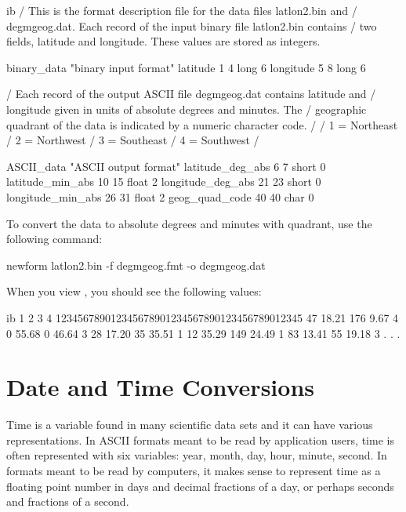 \begin{vcode}{ib}
/ This is the format description file for the data files latlon2.bin and
/ degmgeog.dat. Each record of the input binary file latlon2.bin contains 
/ two fields, latitude and longitude. These values are stored as integers.

binary_data "binary input format"
latitude 1 4 long 6
longitude 5 8 long 6

/ Each record of the output ASCII file degmgeog.dat contains latitude and 
/ longitude given in units of absolute degrees and minutes. The
/ geographic quadrant of the data is indicated by a numeric character code.
/
/ 1 = Northeast
/ 2 = Northwest
/ 3 = Southeast
/ 4 = Southwest
/

ASCII_data "ASCII output format"
latitude_deg_abs 6 7 short 0
latitude_min_abs 10 15 float 2
longitude_deg_abs 21 23 short 0
longitude_min_abs 26 31 float 2
geog_quad_code 40 40 char 0
\end{vcode}

To convert the data to absolute degrees and minutes with quadrant, use
the following command:

\begin{example}
newform latlon2.bin -f degmgeog.fmt -o degmgeog.dat
\end{example}

When you view , you should see the following values: 

\begin{vcode}{ib}
         1         2         3         4
123456789012345678901234567890123456789012345
     47   18.21     176    9.67        4
      0   55.68       0   46.64        3
     28   17.20      35   35.51        1
     12   35.29     149   24.49        1
     83   13.41      55   19.18        3
              .
              .
              . 
\end{vcode}

\section{Date and Time Conversions}
\label{ff,convvars,date}

Time is a variable found in many scientific data sets and it can have
various representations. In ASCII formats meant to be read by
application users, time is often represented with six variables: year,
month, day, hour, minute, second. In formats meant to be read by
computers, it makes sense to represent time as a floating point number
in days and decimal fractions of a day, or perhaps seconds and
fractions of a second.

